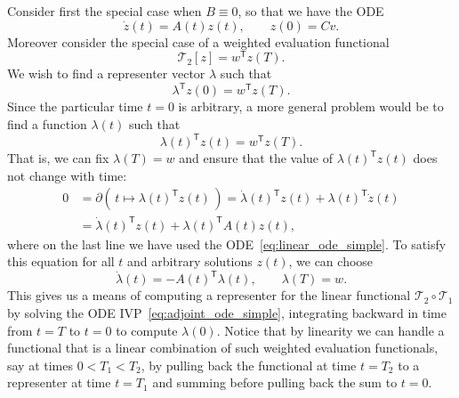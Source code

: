 \documentclass{article}
\begin{document}
Consider first the special case when $B \equiv 0$, so that we have the ODE
\begin{equation}
    \dot z(t) = A(t) z(t), \qquad z(0) = C v.
    \label{eq:linear_ode_simple}
\end{equation}
Moreover consider the special case of a weighted evaluation functional
\begin{equation}
    \mathcal{T}_2[z] = w^\mathsf{T} z(T).
    \label{eq:evaluation_functional}
\end{equation}
We wish to find a representer vector $\lambda$ such that
\begin{equation}
\lambda^\mathsf{T} z(0) = w^\mathsf{T} z(T).
\end{equation}
Since the particular time $t=0$ is arbitrary, a more general problem would be
to find a function $\lambda(t)$ such that
\begin{equation}
    \lambda(t)^\mathsf{T} z(t) = w^\mathsf{T} z(T).
    \label{eq:representer_simple}
\end{equation}
That is, we can fix $\lambda(T) = w$ and ensure that the value of
$\lambda(t)^\mathsf{T} z(t)$ does not change with time:
\begin{align}
    0 &= \partial (\, t \mapsto \lambda(t)^\mathsf{T} z(t) \,)
    = \dot \lambda(t)^\mathsf{T} z(t) + \lambda(t)^\mathsf{T} \dot z(t)
    \\
    &= \dot \lambda(t)^\mathsf{T} z(t) + \lambda(t)^\mathsf{T} A(t) z(t),
\end{align}
where on the last line we have used the ODE~\eqref{eq:linear_ode_simple}.
To satisfy this equation for all $t$ and arbitrary solutions $z(t)$, we can
choose
\begin{equation}
    \dot \lambda(t) = - A(t)^\mathsf{T} \lambda(t), \qquad \lambda(T) = w.
    \label{eq:adjoint_ode_simple}
\end{equation}
This gives us a means of computing a representer for the linear functional
$\mathcal{T}_2 \circ \mathcal{T}_1$ by solving the ODE
IVP~\eqref{eq:adjoint_ode_simple}, integrating backward in time from $t=T$ to
$t=0$ to compute $\lambda(0)$.
Notice that by linearity we can handle a functional that is a linear
combination of such weighted evaluation functionals, say at times $0 < T_1 <
T_2$, by pulling back the functional at time $t=T_2$ to a representer at time
$t=T_1$ and summing before pulling back the sum to $t=0$.
\end{document}

